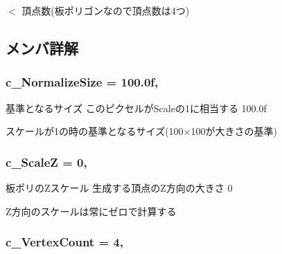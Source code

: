 $<$ 頂点数(板ポリゴンなので頂点数は4つ) 

\subsection{メンバ詳解}
\subsubsection[{\texorpdfstring{c\+\_\+\+Normalize\+Size}{c_NormalizeSize}}]{\setlength{\rightskip}{0pt plus 5cm}c\+\_\+\+Normalize\+Size = 100.\+0f\hspace{0.3cm}{\ttfamily [static]}, {\ttfamily [private]}}\hypertarget{class_a_p_i_1_1_sprite_ad77d7d33858bc5288514fc4bad99a983}{}\label{class_a_p_i_1_1_sprite_ad77d7d33858bc5288514fc4bad99a983}


基準となるサイズ  このピクセルが\+Scaleの1に相当する  100.\+0f 

スケールが1の時の基準となるサイズ(100×100が大きさの基準) 
\subsubsection[{\texorpdfstring{c\+\_\+\+ScaleZ}{c_ScaleZ}}]{\setlength{\rightskip}{0pt plus 5cm}c\+\_\+\+ScaleZ = 0\hspace{0.3cm}{\ttfamily [static]}, {\ttfamily [private]}}\hypertarget{class_a_p_i_1_1_sprite_ad804c9e981cc840e5629fd162893744b}{}\label{class_a_p_i_1_1_sprite_ad804c9e981cc840e5629fd162893744b}


板ポリの\+Zスケール  生成する頂点の\+Z方向の大きさ  0 

Z方向のスケールは常にゼロで計算する 
\subsubsection[{\texorpdfstring{c\+\_\+\+Vertex\+Count}{c_VertexCount}}]{\setlength{\rightskip}{0pt plus 5cm}c\+\_\+\+Vertex\+Count = 4\hspace{0.3cm}{\ttfamily [static]}, {\ttfamily [private]}}\hypertarget{class_a_p_i_1_1_sprite_a7d0612770885bd905daaa74dee3eaca5}{}\label{class_a_p_i_1_1_sprite_a7d0612770885bd905daaa74dee3eaca5}


